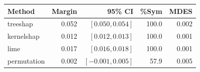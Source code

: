 \begin{tabular}{@{}lrrrr@{}}
\toprule
Method & Margin & 95\% CI & \%Sym & MDES \\
\midrule
treeshap & 0.052 & $[0.050,0.054]$ & 100.0 & 0.002 \\
kernelshap & 0.012 & $[0.012,0.013]$ & 100.0 & 0.001 \\
lime & 0.017 & $[0.016,0.018]$ & 100.0 & 0.001 \\
permutation & 0.002 & $[-0.001,0.005]$ & 57.9 & 0.005 \\
\bottomrule
\end{tabular}
